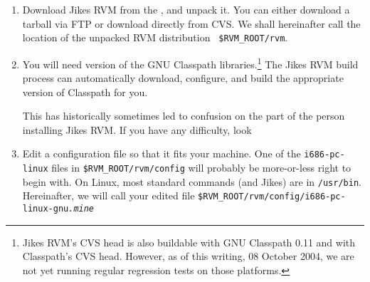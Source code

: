 \begin{enumerate}
We have had mixed experiences with different releases of the Jikes
compiler. Versions 1.13 and 1.18 are known to work for building Jikes
RVM. Versions 1.14 through 1.17, 1.20, 1.21, and 1.22 are known {\em not}\/ to
work.  Version 1.19 has worked for many people, but we have had
problems reported on OSX. 


\begin{small}
{\tt jikes-1.15} in
particular --- installed by default with SuSE Linux 8.1 --- has a
byte-code generation bug that will cause Jikes RVM to crash with an
{\tt ArrayIndexOutOfBounds} exception.  Jikes 1.21 and 1.22 dump core
with an assertion failure when they builds Jikes RVM.

{\tt jikes-1.13}, as of the last
time we tried it (September 28, 2004) works fine, and sometimes generates
better error messages than {\tt jikes-1.18} and {\tt jikes-1.19}.
\end{small}

\item Download Jikes RVM from the , and unpack it.   You can either
  download a tarball via FTP or download directly from CVS.  We shall
hereinafter call the location of the unpacked RVM distribution {\tt
  \$RVM\_\-ROOT\-/\-rvm}.   


%
%
\item You will need version \classpathversion{} of the GNU
Classpath libraries.\footnote{Jikes RVM's CVS head is also buildable with GNU
Classpath 0.11 and with Classpath's CVS head. 
However, as of this writing, 08 October 2004, we are not yet
running regular regression tests on those platforms.}
The Jikes RVM build process can automatically download, 
configure, and build the appropriate version of Classpath for you.

This has historically sometimes led to confusion on the part of the
person installing Jikes RVM.\@  
If you have any difficulty, look \AtManualClasspathRootDiscussion{}

\item Edit a configuration file so that it fits your machine.  One of
the {\tt i686-pc-linux} files in {\tt \$RVM\_\-ROOT/rvm/config} will probably be
more-or-less right to begin with.  On Linux, most standard commands
(and Jikes) are in {\tt /usr/bin}.  Hereinafter, we will call your edited
file {\tt \$RVM\_\-ROOT/rvm/config/i686-pc-linux-gnu{\it .mine}}


\end{enumerate}
